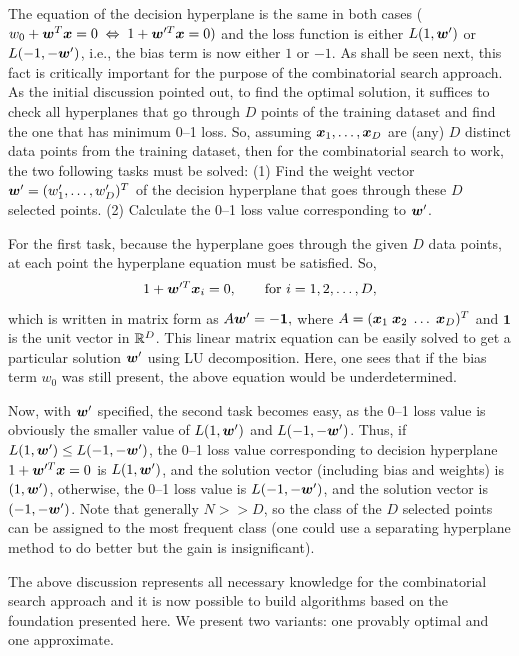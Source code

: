 The equation of the decision hyperplane is the same in both cases 
($w_0 + \boldsymbol{w}^T\boldsymbol{x} = 0 \;  \Leftrightarrow \; 1 + \boldsymbol{w}'^T \boldsymbol{x} = 0)$
and the loss
function is either $L(1, \boldsymbol{w}')$ or $L(-1, -\boldsymbol{w}')$, i.e., the bias term
is now either $1$ or $-1$. As shall be
seen next, this fact is critically important for the purpose of the
combinatorial search approach. As the initial discussion 
pointed out, to find the optimal solution, it suffices to
check all hyperplanes that go through $D$ points of the training
dataset and find the one that has minimum 0--1 loss. So, assuming
$\boldsymbol{x}_1, \dots, \boldsymbol{x}_D$ are (any) $D$ distinct
data points from the training dataset, then for the combinatorial
search to work, the two following tasks must be solved:
(1) Find the weight vector $\boldsymbol{w}'=(w'_1, \dots, w'_D)^T$ of the
  decision hyperplane that goes through these $D$ selected points.
(2) Calculate the 0--1 loss value corresponding to $\boldsymbol{w}'$.

For the first task, because the hyperplane goes through the given $D$
data points, at each point the hyperplane equation must be
satisfied. So,
$$ 1+ \boldsymbol{w}'^T\boldsymbol{x}_i = 0, \quad\quad \text{for } i = 1, 2, \dots, D,$$
which is written in matrix form as 
$A \boldsymbol{w}' = -\boldsymbol{1},$
where $A =(\boldsymbol{x}_1\; \boldsymbol{x}_2\; \dots \; \boldsymbol{x}_D)^T$ and $\boldsymbol{1}$ is the unit vector in $\mathbb{R}^D$.
This linear matrix equation can be easily solved to get a particular solution $\boldsymbol{w}'$ using LU decomposition. Here, one sees that if the bias
term $w_0$ was still present, the above equation would
be underdetermined. 

Now, with $\boldsymbol{w}'$ specified, the second task becomes easy, as the 0--1
loss value is obviously the smaller value of $L(1,\boldsymbol{w}')$ and $L(-1,
-\boldsymbol{w}')$. Thus, if $L(1,\boldsymbol{w}') \leq L(-1,-\boldsymbol{w}')$, the 0--1 loss value
corresponding to decision hyperplane $1+\boldsymbol{w}'^T\boldsymbol{x} = 0$ is
$L(1,\boldsymbol{w}')$, and the solution vector (including bias and weights) is
$(1, \boldsymbol{w}')$, otherwise, the 0--1 loss value is $L(-1,-\boldsymbol{w}')$, and the
solution vector is $(-1,-\boldsymbol{w}')$. Note that generally $N >> D$, so the class of the $D$ selected points can be assigned to the most frequent class (one could use a separating hyperplane method to do better but the gain is insignificant).

The above discussion represents all necessary knowledge for the
combinatorial search approach and it is now possible to build
algorithms based on the foundation presented here.  We present
two variants: one provably optimal and one approximate.

